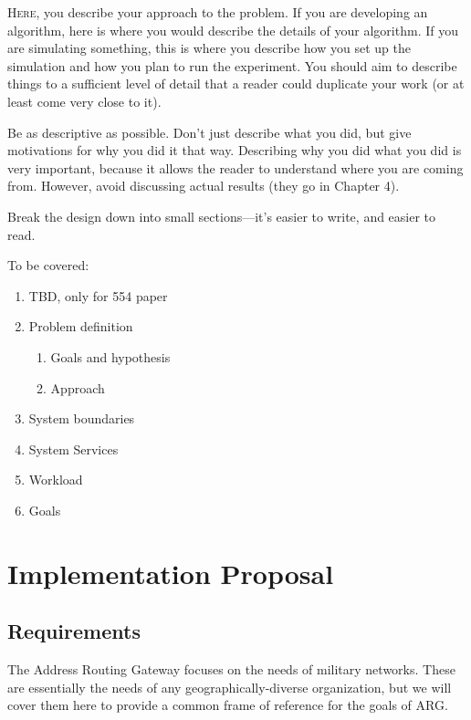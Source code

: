 \lettrine{H}{ere}, you describe your approach to the problem. If you are developing an
algorithm, here is where you would describe the details of your algorithm. If you are
simulating something, this is where you describe how you set up the simulation and
how you plan to run the experiment. You should aim to describe things to a sufficient
level of detail that a reader could duplicate your work (or at least come very close to
it).

\par Be as descriptive as possible. Don’t just describe what you did, but give motivations
for why you did it that way. Describing why you did what you did is very important,
because it allows the reader to understand where you are coming from. However,
avoid discussing actual results (they go in Chapter 4).

\par Break the design down into small sections—it’s easier to write, and easier to read.

\par To be covered:
\begin{enumerate}
\item TBD, only for 554 paper
\item Problem definition
	\begin{enumerate}
	\item Goals and hypothesis
	\item Approach
	\end{enumerate}
\item System boundaries
\item System Services
\item Workload

\item Goals
\end{enumerate}

\section{Implementation Proposal}
\label{sec:implementation}
\subsection{Requirements}
\par The Address Routing Gateway focuses on the needs of military networks. These are essentially the needs of any geographically-diverse organization, but we will cover them here to provide a common frame of reference for the goals of ARG. 

